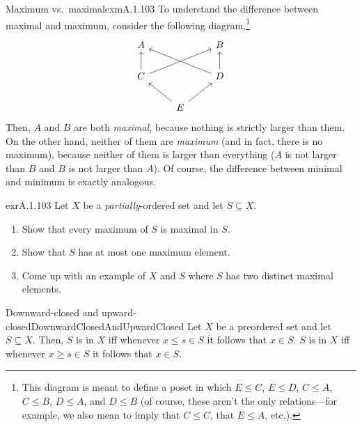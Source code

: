 \begin{exm}{Maximum vs.~maximal}{exmA.1.103}
To understand the difference between maximal and maximum, consider the following diagram.\footnote{This diagram is meant to define a poset in which $E\leq C$, $E\leq D$, $C\leq A$, $C\leq B$, $D\leq A$, and $D\leq B$ (of course, these aren't the only relations---for example, we also mean to imply that $C\leq C$, that $E\leq A$, etc.).}
\begin{equation}
\begin{tikzcd}
A & & B \\
C \ar[u] \ar[rru] & & D \ar[llu] \ar[u] \\
  & E \ar[lu] \ar[ru] &
\end{tikzcd}
\end{equation}
Then, $A$ and $B$ are both \emph{maximal}, because nothing is strictly larger than them.  On the other hand, neither of them are \emph{maximum} (and in fact, there is no maximum), because neither of them is larger than everything ($A$ is not larger than $B$ and $B$ is not larger than $A$).  Of course, the difference between minimal and minimum is exactly analogous.
\end{exm}
\begin{exr}{}{exrA.1.103}
Let $X$ be a \emph{partially}-ordered set and let $S\subseteq X$.
\begin{enumerate}
\item Show that every maximum of $S$ is maximal in $S$.
\item Show that $S$ has at most one maximum element.
\item Come up with an example of $X$ and $S$ where $S$ has two distinct maximal elements.
\end{enumerate}
\end{exr}
\begin{dfn}{Downward-closed and upward-\\closed}{DownwardClosedAndUpwardClosed}
Let $X$ be a preordered set and let $S\subseteq X$.  Then, $S$ is  in $X$ iff whenever $x\leq s\in S$ it follows that $x\in S$.  $S$ is  in $X$ iff whenever $x\geq s\in S$ it follows that $x\in S$.
\end{dfn}
